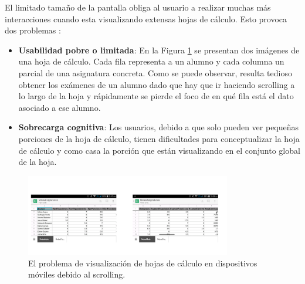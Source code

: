 El limitado tamaño de la pantalla obliga al usuario a realizar muchas más interacciones cuando esta visualizando extensas hojas de cálculo. Esto provoca dos problemas \cite{Flood2011Tedious}:
\begin{itemize}
	\item \textbf{Usabilidad pobre o limitada}: En la Figura \ref{fig:MobileSheetScrolling} se presentan dos imágenes de una hoja de cálculo. Cada fila representa a un alumno y cada columna un parcial de una asignatura concreta. Como se puede observar, resulta tedioso obtener los exámenes de un alumno dado que hay que ir haciendo scrolling a lo largo de la hoja y rápidamente se pierde el foco de en qué fila está el dato asociado a ese alumno.
	\item \textbf{Sobrecarga cognitiva}: Los usuarios, debido a que solo pueden ver pequeñas porciones de la hoja de cálculo, tienen dificultades para conceptualizar la hoja de cálculo y como casa la porción que están visualizando en el conjunto global de la hoja.
\end{itemize}

\begin{figure}[htb]
	\centering
	\includegraphics[width=0.8\textwidth]{./figs/MobileSheetScrolling.png}
	\caption{El problema de visualización de hojas de cálculo en dispositivos móviles debido al scrolling.}
	\label{fig:MobileSheetScrolling}
\end{figure}

